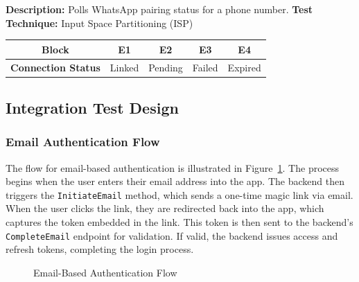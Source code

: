 \textbf{Description:} Polls WhatsApp pairing status for a phone number.  
\textbf{Test Technique:} Input Space Partitioning (ISP)

\begin{table}[h!]
\centering
\begin{tabular}{|c|c|c|c|c|}
\hline
\textbf{Block} & \textbf{E1} & \textbf{E2} & \textbf{E3} & \textbf{E4} \\
\hline
\textbf{Connection Status} & Linked & Pending & Failed & Expired \\
\hline
\end{tabular}
\end{table}

\subsection*{Integration Test Design}

\subsubsection*{Email Authentication Flow}

The flow for email-based authentication is illustrated in Figure~\ref{fig:email-auth-flow}. The process begins when the user enters their email address into the app. The backend then triggers the \texttt{InitiateEmail} method, which sends a one-time magic link via email. When the user clicks the link, they are redirected back into the app, which captures the token embedded in the link. This token is then sent to the backend's \texttt{CompleteEmail} endpoint for validation. If valid, the backend issues access and refresh tokens, completing the login process.

\begin{figure}[h!]
    \centering
    \caption{Email-Based Authentication Flow}
    \label{fig:email-auth-flow}
\end{figure}    

